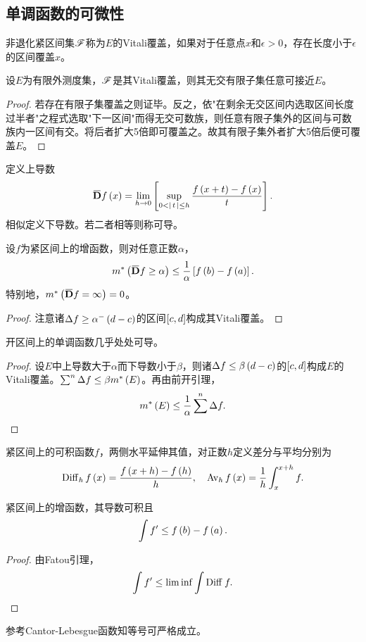 \documentclass{ctexrep}
\begin{document}
  \subsection{单调函数的可微性}
  \begin{definition}
    非退化紧区间集$\mathscr{F}$称为$E$的Vitali覆盖，如果对于任意点$x$和$\epsilon>0$，存在长度小于$\epsilon$的区间覆盖$x$。
  \end{definition}
  \begin{lemma}[Vitali覆盖引理]
    设$E$为有限外测度集，$\mathscr{F}$是其Vitali覆盖，则其无交有限子集任意可接近$E$。
  \end{lemma}
  \begin{proof}
    若存在有限子集覆盖之则证毕。反之，依"在剩余无交区间内选取区间长度过半者"之程式选取"下一区间"而得无交可数族，则任意有限子集外的区间与可数族内一区间有交。将后者扩大5倍即可覆盖之。故其有限子集外者扩大5倍后便可覆盖$E$。
  \end{proof}
  \begin{definition}
    定义上导数
    \[ \DDu f\pare{x} = \lim_{h\to 0}\brac{\sup_{0<\abs{t}\le h} \frac{f\pare{x+t}-f\pare{x}}{t}}. \]
    相似定义下导数。若二者相等则称可导。
  \end{definition}
  \begin{lemma}
    设$f$为紧区间上的增函数，则对任意正数$\alpha$，
    \[ m^*\pare{\DDu f \ge \alpha} \le \rec{\alpha}\brac{f\pare{b}-f\pare{a}}. \]
    特别地，$m^*\pare{\DDu f = \infty} = 0$。
  \end{lemma}
  \begin{proof}
    注意诸$\Delta f \ge \alpha^-\left(d-c\right)$的区间$\left[c,d\right]$构成其Vitali覆盖。
  \end{proof}
  \begin{theorem}[Lebesgue]
    开区间上的单调函数几乎处处可导。
  \end{theorem}
  \begin{proof}
    设$E$中上导数大于$\alpha$而下导数小于$\beta$，则诸$\Delta f \le \beta \left(d-c\right)$的$\left[c,d\right]$构成$E$的Vitali覆盖。$\sum^n \Delta f \le \beta m^*\left(E\right)$。再由前开引理，
    \[ m^*\left(E\right)\le \frac{1}{\alpha} \sum^n \Delta f. \qedhere \]
  \end{proof}
  \begin{definition}
    紧区间上的可积函数$f$，两侧水平延伸其值，对正数$h$定义差分与平均分别为
    \[ \mathrm{Diff}_{h}\,f\left(x\right)=\frac{f\left(x+h\right)-f\left(h\right)}{h},\quad \mathrm{Av}_{h}\,f\left(x\right) = \frac{1}{h}\int_x^{x+h}f. \]
  \end{definition}
  \begin{collary}
    \label{coll:diff2int}
    紧区间上的增函数，其导数可积且
    \[ \int f' \le f\left(b\right) - f\left(a\right). \]
  \end{collary}
  \begin{proof}
    由Fatou引理，
    \[ \int f' \le \lim \inf \int \mathrm{Diff}_{}\, f. \qedhere \]
  \end{proof}
  参考Cantor-Lebesgue函数知等号可严格成立。
\end{document}
